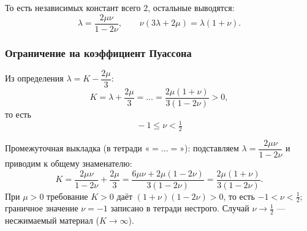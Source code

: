 То есть независимых констант всего $2$, остальные выводятся:
\[
  \lambda = \frac{2\mu\nu}{1-2\nu} ,
  \qquad
  \nu(3\lambda + 2\mu) = \lambda(1+\nu) .
\]

\subsubsection*{Ограничение на коэффициент Пуассона}

Из определения $\lambda = K - \dfrac{2\mu}{3}$:
\[
  K = \lambda + \frac{2\mu}{3} = \dots = \frac{2\mu(1+\nu)}{3(1-2\nu)} > 0 ,
\]
то есть
\[
  \boxed{\ -1 \le \nu < \tfrac{1}{2}\ }
\]

\begin{idea}
Промежуточная выкладка (в тетради «$=\dots=$»): подставляем
$\lambda = \dfrac{2\mu\nu}{1-2\nu}$ и приводим к общему знаменателю:
\[
  K = \frac{2\mu\nu}{1-2\nu} + \frac{2\mu}{3}
    = \frac{6\mu\nu + 2\mu(1-2\nu)}{3(1-2\nu)}
    = \frac{2\mu(1+\nu)}{3(1-2\nu)} .
\]
При $\mu>0$ требование $K>0$ даёт $(1+\nu)(1-2\nu) > 0$, то есть
$-1 < \nu < \tfrac12$; граничное значение $\nu=-1$ записано в тетради
нестрого. Случай $\nu \to \tfrac12$ — несжимаемый материал ($K\to\infty$).
\end{idea}
